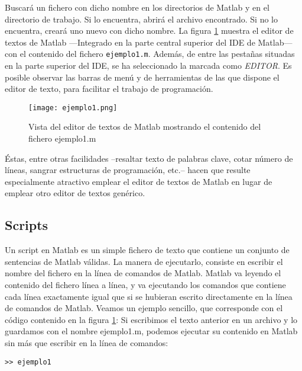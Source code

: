 Buscará un fichero con dicho nombre en los directorios de Matlab y en el directorio de trabajo. Si lo encuentra, abrirá el archivo encontrado. Si no lo encuentra, creará uno nuevo con dicho nombre. La figura \ref{fig:edv} muestra el editor de textos de Matlab ---Integrado en la parte central superior del IDE de Matlab--- con el contenido del fichero \texttt{ejemplo1.m}. Además, de entre las pestañas situadas en la parte superior del IDE, se ha seleccionado la marcada como \emph{EDITOR}. Es posible observar las barras de menú y de herramientas de las que dispone el editor de texto, para facilitar el trabajo de programación. 
\begin{figure}[h]
\centering
\texttt{[image: ejemplo1.png]}
\caption{Vista del editor de textos de Matlab mostrando el contenido del fichero ejemplo1.m}
\label{fig:edv}
\end{figure}
Éstas, entre otras facilidades --resaltar texto de palabras clave, cotar número de líneas, sangrar estructuras de programación, etc.-- hacen que resulte especialmente atractivo emplear el editor de textos de Matlab en lugar de emplear otro editor de textos genérico.

\subsection{Scripts} 
Un script en Matlab es un simple fichero de texto que contiene un conjunto de sentencias de Matlab válidas. La manera de ejecutarlo, consiste en escribir el nombre del fichero en la línea de comandos de Matlab. Matlab va leyendo el contenido del fichero línea a línea, y va ejecutando los comandos que contiene cada línea exactamente igual que si se hubieran escrito directamente en la línea de comandos de Matlab. Veamos un ejemplo sencillo, que corresponde con el código contenido en la figura \ref{fig:edv}:
Si escribimos el texto anterior en un archivo y lo guardamos con el nombre ejemplo1.m, podemos ejecutar su contenido en Matlab sin más que escribir en la línea de comandos:
\begin{verbatim}
>> ejemplo1
\end{verbatim}

